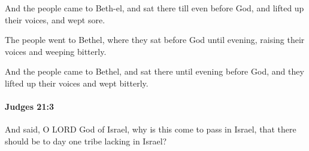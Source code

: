 			\begin{versebox}
					\item[BHS] 
					\item[ASV] And the people came to Beth-el, and sat there till even before God, and lifted up their voices, and wept sore.
					\item[NIV] The people went to Bethel, where they sat before God until evening, raising their voices and weeping bitterly.
					\item[NRSV] And the people came to Bethel, and sat there until evening before God, and they lifted up their voices and wept bitterly.
			\end{versebox}

		\paragraph{Judges 21:3} %
			\label{JUDGES-21-3}

			And said, O LORD God of Israel, why is this come to pass in Israel, that there should be to day one tribe lacking in Israel?

